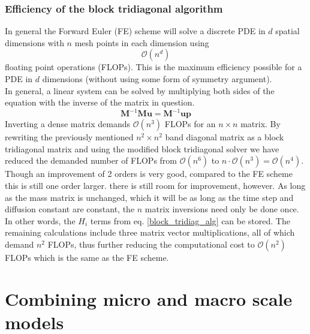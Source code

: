  \subsubsection{Efficiency of the block tridiagonal algorithm}
 
 In general the Forward Euler (FE) scheme will solve a discrete PDE in $d$ spatial dimensions with $n$ mesh points in each dimension using
 \begin{equation*}
  \mathcal O(n^d)
 \end{equation*}
floating point operations (FLOPs). 
This is the maximum efficiency possible for a PDE in $d$ dimensions (without using some form of symmetry argument).\\

In general, a linear system can be solved by multiplying both sides of the equation with the inverse of the matrix in question. 
\begin{equation*}
 \mathbf M^{-1}\mathbf M\mathbf u = \mathbf{M}^{-1}\mathbf{up}
\end{equation*}
Inverting a dense matrix demands $\mathcal O(n^3)$ FLOPs for an $n\times n$ matrix. 
By rewriting the previously mentioned $n^2\times n^2$ band diagonal matrix as a block tridiagonal matrix and using the modified block tridiagonal solver we have reduced the demanded number of FLOPs from $\mathcal{O}(n^6)$ to $n\cdot\mathcal{O}(n^3) = \mathcal{O}(n^4)$. 
Though an improvement of 2 orders is very good, compared to the FE scheme this is still one order larger.
there is still room for improvement, however. 
As long as the mass matrix is unchanged, which it will be as long as the time step and diffusion constant are constant, the $n$ matrix inversions need only be done once. 
In other words, the $H_i$ terms from eq. \eqref{block_tridiag_alg} can be stored. 
The remaining calculations include three matrix vector multiplications, all of which demand $n^2$ FLOPs, thus further reducing the computational cost to $\mathcal{O}(n^2)$ FLOPs which is the same as the FE scheme.

\section{Combining micro and macro scale models}

